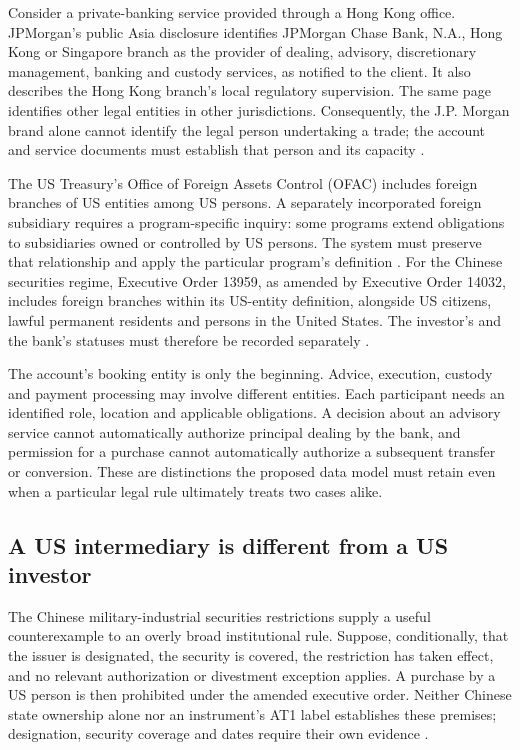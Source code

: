 \documentclass[12pt,a4paper,oneside,openany]{book}
\begin{document}
Consider a private-banking service provided through a Hong Kong office.
JPMorgan's public Asia disclosure identifies JPMorgan Chase Bank, N.A., Hong
Kong or Singapore branch as the provider of dealing, advisory, discretionary
management, banking and custody services, as notified to the client. It also
describes the Hong Kong branch's local regulatory supervision. The same page
identifies other legal entities in other jurisdictions. Consequently, the
J.P. Morgan brand alone cannot identify the legal person undertaking a trade;
the account and service documents must establish that person and its capacity
\citep[Asia service-provider disclosure]{jpmprivatebank2026}.

The US Treasury's Office of Foreign Assets Control (OFAC) includes foreign
branches of US entities among US persons. A separately incorporated foreign
subsidiary requires a program-specific inquiry: some programs extend obligations
to subsidiaries owned or controlled by US persons. The system must preserve
that relationship and apply the particular program's definition
\citep[FAQ 11]{ofacuspersons2024}. For the Chinese securities regime, Executive
Order 13959, as amended by Executive Order 14032, includes foreign branches
within its US-entity definition, alongside US citizens, lawful permanent
residents and persons in the United States. The investor's and the bank's
statuses must therefore be recorded separately
\citep[replacement section 3(d)]{eo140322021}.

The account's booking entity is only the beginning. Advice, execution, custody
and payment processing may involve different entities. Each participant needs
an identified role, location and applicable obligations. A decision about an
advisory service cannot automatically authorize principal dealing by the bank,
and permission for a purchase cannot automatically authorize a subsequent
transfer or conversion. These are distinctions the proposed data model must
retain even when a particular legal rule ultimately treats two cases alike.

\subsection{A US intermediary is different from a US investor}

The Chinese military-industrial securities restrictions supply a useful
counterexample to an overly broad institutional rule. Suppose, conditionally,
that the issuer is designated, the security is covered, the restriction has
taken effect, and no relevant authorization or divestment exception applies.
A purchase by a US person is then prohibited under the amended executive order.
Neither Chinese state ownership alone nor an instrument's AT1 label establishes
these premises; designation, security coverage and dates require their own
evidence \citep[replacement section 1]{eo140322021}.
\end{document}

